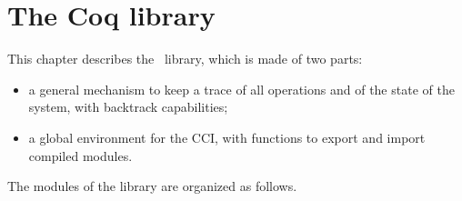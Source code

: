 
\newpage
\section*{The Coq library}

\ocwsection \label{library}
This chapter describes the \Coq\ library, which is made of two parts:
\begin{itemize}
  \item a general mechanism to keep a trace of all operations and of
    the state of the system, with backtrack capabilities;
  \item a global environment for the CCI, with functions to export and
    import compiled modules.
\end{itemize}
The modules of the library are organized as follows.

\bigskip
\begin{center}\end{center}
